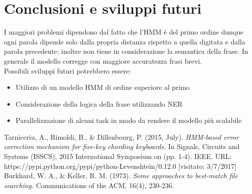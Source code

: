 \documentclass[a4paper,11pt]{article}
\begin{document}
\section{Conclusioni e sviluppi futuri}
	I maggiori problemi dipendono dal fatto che l'HMM è del primo ordine dunque ogni parola dipende solo dalla propria distanza rispetto a quella 
	digitata   	e dalla parola precedente; inoltre non tiene in considerazione la semantica della frase. 
    In generale il modello corregge con maggiore accuratezza frasi brevi.\\
	Possibili sviluppi futuri potrebbero essere:
    \begin{itemize}
    	\item Utilizzo di un modello HMM di ordine superiore al primo
        \item Considerazione della logica della frase utilizzando NER
        \item Parallelizzazione di alcuni task in modo da rendere il modello più scalabile
    \end{itemize}
\newpage
\begin{thebibliography}{1}
 	Tarniceriu, A., Rimoldi, B., \& Dillenbourg, P. (2015, July).
    \textit{HMM-based error correction mechanism for five-key chording keyboards.} In Signals, Circuits and Systems (ISSCS), 2015 International Symposium on (pp. 1-4). IEEE. 
 	URL: https://pypi.python.org/pypi/python-Levenshtein/0.12.0 [visitato: 3/7/2017]
  Burkhard, W. A., \& Keller, R. M. (1973). 
  \textit{Some approaches to best-match file searching.}
  Communications of the ACM, 16(4), 230-236.
\end{thebibliography}
\end{document}
